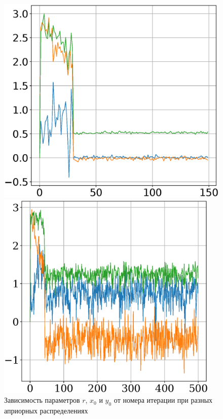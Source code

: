 \documentclass[12pt,twoside]{article}
\begin{document}
\begin{figure}[h]
\begin{minipage}{.32\textwidth}
\end{minipage}
\begin{minipage}{.32\textwidth}
\hspace{-2.1mm}
      \includegraphics[width = \textwidth]{901noise.eps}
\end{minipage}
\begin{minipage}{.32\textwidth}
\hspace{-2mm}
      \includegraphics[width = 0.95\textwidth]{902noise.eps}
\end{minipage}
\caption{Зависимость параметров $r$, $x_0$ и $y_0$ от номера итерации при разных априорных распределениях}
\end{figure}
\end{document}
